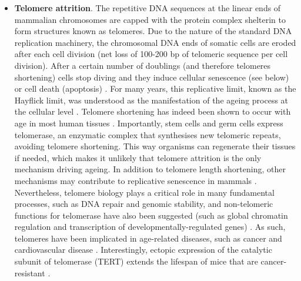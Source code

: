\begin{itemize}
	\item \textbf{Telomere attrition}. The repetitive DNA sequences at the linear ends of mammalian chromosomes are capped with the protein complex shelterin to form structures known as telomeres. Due to the nature of the standard DNA replication machinery, the chromosomal DNA ends of somatic cells are eroded after each cell division (net loss of 100-200 bp of telomeric sequence per cell division). After a certain number of doublings (and therefore telomeres shortening) cells stop diving and they induce cellular senescence (see below) or cell death (apoptosis) \citep{OSullivan2010}. For many years, this replicative limit, known as the Hayflick limit, was understood as the manifestation of the ageing process at the cellular level \citep{Hayflick1961,Hayflick1998}. Telomere shortening has indeed been shown to occur with age in most human tissues \citep{Blasco2007}. Importantly, stem cells and germ cells express telomerase, an enzymatic complex that synthesises new telomeric repeats, avoiding telomere shortening. This way organisms can regenerate their tissues if needed, which makes it unlikely that telomere attrition is the only mechanism driving ageing. In addition to telomere length shortening, other mechanisms may contribute to replicative senescence in mammals \citep{OSullivan2010}. Nevertheless, telomere biology plays a critical role in many fundamental processes, such as DNA repair and genomic stability, and non-telomeric functions for telomerase have also been suggested (such as global chromatin regulation and transcription of developmentally-regulated genes) \citep{OSullivan2010}. As such, telomeres have been implicated in age-related diseases, such as cancer and cardiovascular disease \citep{OSullivan2010,Blasco2007}. Interestingly, ectopic expression of the catalytic subunit of telomerase (TERT) extends the lifespan of mice that are cancer-resistant \citep{Tomas-Loba2008}. 
	

\end{itemize}
